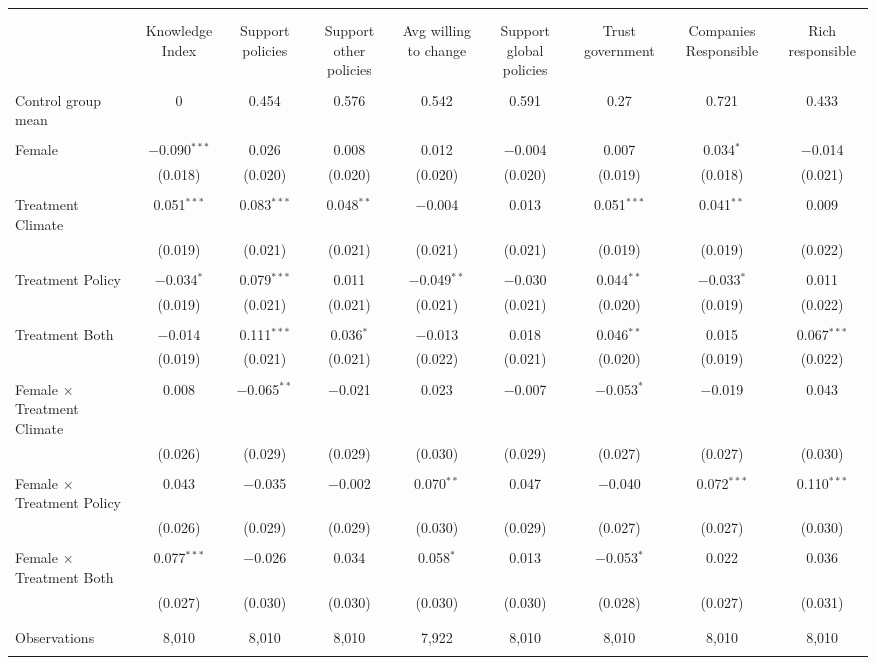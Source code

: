 
\begin{tabular}{@{\extracolsep{5pt}}lcccccccc} 
\\[-1.8ex]\hline 
\hline \\[-1.8ex] 
\\[-1.8ex] & Knowledge Index & Support policies & Support other policies & Avg willing to change & Support global policies & Trust government & Companies Responsible & Rich responsible \\ 
\hline \\[-1.8ex] 
 Control group mean & 0 & 0.454 & 0.576 & 0.542 & 0.591 & 0.27 & 0.721 & 0.433  \\ \hline \\[-1.8ex] Female & $-$0.090$^{***}$ & 0.026 & 0.008 & 0.012 & $-$0.004 & 0.007 & 0.034$^{*}$ & $-$0.014 \\ 
  & (0.018) & (0.020) & (0.020) & (0.020) & (0.020) & (0.019) & (0.018) & (0.021) \\ 
  & & & & & & & & \\ 
 Treatment Climate & 0.051$^{***}$ & 0.083$^{***}$ & 0.048$^{**}$ & $-$0.004 & 0.013 & 0.051$^{***}$ & 0.041$^{**}$ & 0.009 \\ 
  & (0.019) & (0.021) & (0.021) & (0.021) & (0.021) & (0.019) & (0.019) & (0.022) \\ 
  & & & & & & & & \\ 
 Treatment Policy & $-$0.034$^{*}$ & 0.079$^{***}$ & 0.011 & $-$0.049$^{**}$ & $-$0.030 & 0.044$^{**}$ & $-$0.033$^{*}$ & 0.011 \\ 
  & (0.019) & (0.021) & (0.021) & (0.021) & (0.021) & (0.020) & (0.019) & (0.022) \\ 
  & & & & & & & & \\ 
 Treatment Both & $-$0.014 & 0.111$^{***}$ & 0.036$^{*}$ & $-$0.013 & 0.018 & 0.046$^{**}$ & 0.015 & 0.067$^{***}$ \\ 
  & (0.019) & (0.021) & (0.021) & (0.022) & (0.021) & (0.020) & (0.019) & (0.022) \\ 
  & & & & & & & & \\ 
 Female $\times$ Treatment Climate & 0.008 & $-$0.065$^{**}$ & $-$0.021 & 0.023 & $-$0.007 & $-$0.053$^{*}$ & $-$0.019 & 0.043 \\ 
  & (0.026) & (0.029) & (0.029) & (0.030) & (0.029) & (0.027) & (0.027) & (0.030) \\ 
  & & & & & & & & \\ 
 Female $\times$ Treatment Policy & 0.043 & $-$0.035 & $-$0.002 & 0.070$^{**}$ & 0.047 & $-$0.040 & 0.072$^{***}$ & 0.110$^{***}$ \\ 
  & (0.026) & (0.029) & (0.029) & (0.030) & (0.029) & (0.027) & (0.027) & (0.030) \\ 
  & & & & & & & & \\ 
 Female $\times$ Treatment Both & 0.077$^{***}$ & $-$0.026 & 0.034 & 0.058$^{*}$ & 0.013 & $-$0.053$^{*}$ & 0.022 & 0.036 \\ 
  & (0.027) & (0.030) & (0.030) & (0.030) & (0.030) & (0.028) & (0.027) & (0.031) \\ 
  & & & & & & & & \\ 
\hline \\[-1.8ex] 

Observations & 8,010 & 8,010 & 8,010 & 7,922 & 8,010 & 8,010 & 8,010 & 8,010 \\ 
\hline 
\hline \\[-1.8ex] 
\end{tabular} 